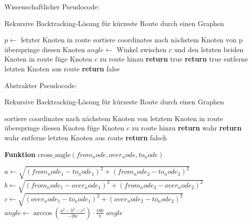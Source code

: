 \documentclass[a4paper,10pt,ngerman]{scrartcl}
\begin{document}
Wissenschaftlicher Pseudocode:

\begin{algorithm}
\caption{Rekursive Backtracking-Lösung für kürzeste Route durch einen Graphen}
\begin{algorithmic}[1]
\State $p \gets$ letzter Knoten in route
\State sortiere coordinates nach nächstem Knoten von p
\EndIf
{}
\State überspringe diesen Knoten
\EndIf
\State $angle \gets$ Winkel zwischen $c$ und den letzten beiden Knoten in route
\State füge Knoten $c$ zu route hinzu
\State \textbf{return} true
\EndIf
{}
\State \textbf{return} true
\Else
\State entferne letzten Knoten aus route
\EndIf
\EndIf
\EndFor
\State \textbf{return} false
\EndFunction
\end{algorithmic}
\end{algorithm}

Abstrakter Pseudocode:

\begin{algorithm}
\caption{Rekursive Backtracking-Lösung für kürzeste Route durch einen Graphen}
\begin{algorithmic}[1]
\State sortiere coordinates nach nächstem Knoten von letztem Knoten in route
\EndIf
{}
\State überspringe diesen Knoten
\EndIf
{}
\State füge Knoten $c$ zu route hinzu
\State \textbf{return} wahr
\EndIf
{}
\State \textbf{return} wahr
\Else
\State entferne letzten Knoten aus route
\EndIf
\EndIf
\EndFor
\State \textbf{return} falsch
\EndFunction
\end{algorithmic}
\end{algorithm}

\textbf{Funktion} $\text{cross_angle}(from_node, over_node, to_node)$
\begin{algorithmic}[1]
\State $a \gets \sqrt{(from_node_1 - to_node_1)^2 + (from_node_2 - to_node_2)^2}$
\State $b \gets \sqrt{(from_node_1 - over_node_1)^2 + (from_node_2 - over_node_2)^2}$
\State $c \gets \sqrt{(over_node_1 - to_node_1)^2 + (over_node_2 - to_node_2)^2}$
\State $angle \gets \arccos\left(\frac{a^2 - b^2 - c^2}{-2bc}\right) \cdot \frac{180}{\pi}$
\State \Return $angle$
\end{algorithmic}
\end{document}
